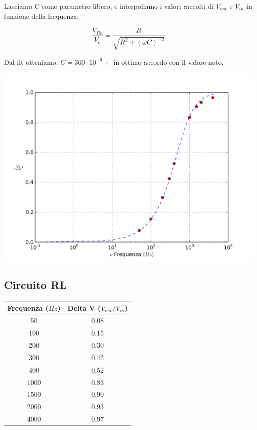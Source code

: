 Lasciamo C come parametro libero, e interpoliamo i valori raccolti di $V_{out}$ e $V_{in}$ in funzione della frequenza:

$$\frac{V_{Ro}}{V_o} = \frac{R}{\sqrt{R^2+(\omega C)^{-2}}}$$

Dal fit otteniamo: $C=360 \cdot 10^{-9} \pm  $ in ottimo accordo con il valore noto.

\begin{center}
 \includegraphics[scale=0.70]{grafici/C3/ddpcond.png}
\end{center}



\subsection{Circuito RL}


\begin{center}
\begin{tabular}{*{2}{c}}
Frequenza ($Hz$) & Delta V ($V_{out}/V_{in}$) \\
\midrule
50 & 0.08 \\
100 & 0.15 \\
200 & 0.30 \\
300 & 0.42 \\
400 & 0.52 \\
1000 & 0.83 \\
1500 & 0.90 \\
2000 & 0.93 \\
4000 & 0.97 \\
\end{tabular}
\end{center}


